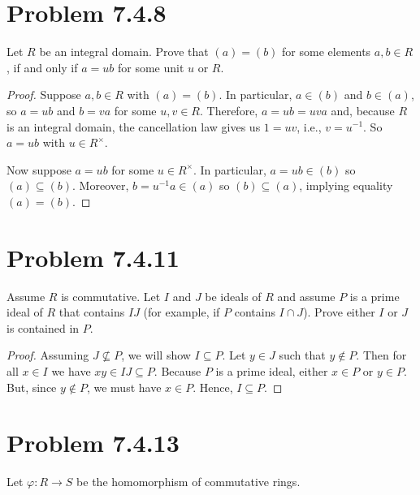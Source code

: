 \documentclass[12pt]{article}
\newenvironment{problem}
    {\begin{lrbox}{\mybox}\begin{minipage}{0.98\textwidth}}
    {\end{minipage}\end{lrbox}\begin{center}\framebox[\textwidth]{\usebox{\mybox}}\end{center}}
\theoremstyle{definition}
\renewcommand{\phi}{\varphi}
\newcommand{\<}{\left\langle}
\renewcommand{\>}{\right\rangle}
\begin{document}
\section{Problem 7.4.8}
\begin{problem}
    Let $R$ be an integral domain. Prove that $(a) = (b)$ for some elements $a, b \in R$, if and only if $a = ub$ for some unit $u$ or $R$.
\end{problem}

\begin{proof}
    Suppose $a, b \in R$ with $(a) = (b)$. In particular, $a \in (b)$ and $b \in (a) $, so $a = ub$ and $b = va$ for some $u, v \in R$. Therefore, $a = ub = uva$ and, because $R$ is an integral domain, the cancellation law gives us $1 = uv$, i.e., $v = u^{-1}$. So $a = ub$ with $u \in R^\times$.
    
    Now suppose $a = ub$ for some $u \in R^\times$. In particular, $a = ub \in (b)$ so $(a) \subseteq (b)$. Moreover, $b = u^{-1}a \in (a)$ so $(b) \subseteq (a)$, implying equality $(a) = (b)$.
    
\end{proof}

\section{Problem 7.4.11}
\begin{problem}
    Assume $R$ is commutative. Let $I$ and $J$ be ideals of $R$ and assume $P$ is a prime ideal of $R$ that contains $IJ$ (for example, if $P$ contains $I \cap J$). Prove either $I$ or $J$ is contained in $P$.
\end{problem}

\begin{proof}
    Assuming $J \not\subseteq P$, we will show $I \subseteq P$. Let $y \in J$ such that $y \notin P$. Then for all $x \in I$ we have $xy \in IJ \subseteq P$. Because $P$ is a prime ideal, either $x \in P$ or $y \in P$. But, since $y \notin P$, we must have $x \in P$. Hence, $I \subseteq P$.
    
\end{proof}

\newpage
\section{Problem 7.4.13}
\begin{problem}
    Let $\phi : R \to S$ be the homomorphism of commutative rings.
\end{problem}
\end{document}
